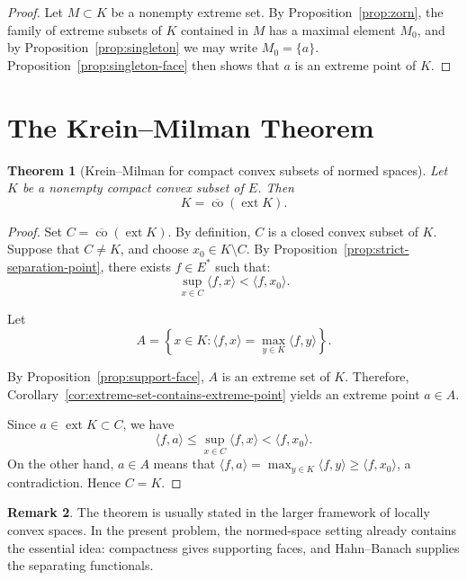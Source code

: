 \documentclass[reqno]{amsart}
\newtheorem{theorem}{Theorem}[section]
\theoremstyle{definition}
\newtheorem{remark}[theorem]{Remark}
\newcommand{\ip}[2]{\langle #1, #2 \rangle}
\newcommand{\ext}{\operatorname{ext}}
\newcommand{\co}{\operatorname{co}}
\begin{document}
\begin{proof}
Let $M \subset K$ be a nonempty extreme set. By Proposition~\ref{prop:zorn}, the family of extreme subsets of $K$ contained in $M$ has a maximal element $M_0$, and by Proposition~\ref{prop:singleton} we may write $M_0 = \{a\}$. Proposition~\ref{prop:singleton-face} then shows that $a$ is an extreme point of $K$.
\end{proof}

\section{The Krein--Milman Theorem}

\begin{theorem}[Krein--Milman for compact convex subsets of normed spaces]
Let $K$ be a nonempty compact convex subset of $E$. Then
\begin{equation}
    K = \overline{\co}(\ext K).
\end{equation}
\end{theorem}

\begin{proof}
Set $C = \overline{\co}(\ext K)$. By definition, $C$ is a closed convex subset of $K$. Suppose that $C \neq K$, and choose $x_0 \in K \setminus C$. By Proposition~\ref{prop:strict-separation-point}, there exists $f \in E^*$ such that:
\begin{equation*}
    \sup_{x \in C} \ip{f}{x} < \ip{f}{x_0}.
\end{equation*}

Let
\begin{equation*}
    A = \left\{x \in K : \ip{f}{x} = \max_{y \in K} \ip{f}{y} \right\}.
\end{equation*}

By Proposition~\ref{prop:support-face}, $A$ is an extreme set of $K$. Therefore, Corollary~\ref{cor:extreme-set-contains-extreme-point} yields an extreme point $a \in A$. 

Since $a \in \ext K \subset C$, we have
\begin{equation*}
    \ip{f}{a} \le \sup_{x \in C} \ip{f}{x} < \ip{f}{x_0}.
\end{equation*}
On the other hand, $a \in A$ means that $\ip{f}{a} = \max_{y \in K} \ip{f}{y} \ge \ip{f}{x_0}$, a contradiction. Hence $C = K$.
\end{proof}

\begin{remark}
The theorem is usually stated in the larger framework of locally convex spaces. In the present problem, the normed-space setting already contains the essential idea: compactness gives supporting faces, and Hahn--Banach supplies the separating functionals.
\end{remark}
\end{document}
